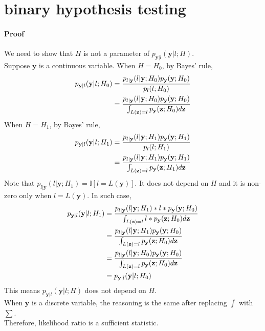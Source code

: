 \documentclass{article}
\begin{document}
\section{binary hypothesis testing}
\paragraph{Proof}
We need to show that $H$ is not a parameter of $p_{\mathbf{y}|l}(\mathbf{y}|l;H)$.\\
Suppose $\mathbf{y}$ is a continuous variable. When $H=H_0$, by Bayes' rule,
\begin{align}
	p_{\mathbf{y}|l}(\mathbf{y}|l;H_0)&=\frac{p_{l|\mathbf{y}}(l|\mathbf{y};H_0)p_{\mathbf{y}}(\mathbf{y};H_0)}{p_{l}(l;H_0)}\notag\\
	&=\frac{p_{l|\mathbf{y}}(l|\mathbf{y};H_0)p_{\mathbf{y}}(\mathbf{y};H_0)}{\int_{L(\mathbf{z})=l}p_{\mathbf{y}}(\mathbf{z};H_0)d\mathbf{z}}\notag
\end{align}
When $H=H_1$, by Bayes' rule,
\begin{align}
	p_{\mathbf{y}|l}(\mathbf{y}|l;H_1)&=\frac{p_{l|\mathbf{y}}(l|\mathbf{y};H_1)p_{\mathbf{y}}(\mathbf{y};H_1)}{p_{l}(l;H_1)}\notag\\
	&=\frac{p_{l|\mathbf{y}}(l|\mathbf{y};H_1)p_{\mathbf{y}}(\mathbf{y};H_1)}{\int_{L(\mathbf{z})=l}p_{\mathbf{y}}(\mathbf{z};H_1)d\mathbf{z}}\notag
\end{align}
Note that $p_{l|\mathbf{y}}(l|\mathbf{y};H_1)=\mathbb{I}[l=L(\mathbf{y})]$. It does not depend on $H$ and it is non-zero only when $l=L(\mathbf{y})$. In such case,
\begin{align}
	p_{\mathbf{y}|l}(\mathbf{y}|l;H_1)&=\frac{p_{l|\mathbf{y}}(l|\mathbf{y};H_1)*l*p_{\mathbf{y}}(\mathbf{y};H_0)}{\int_{L(\mathbf{z})=l}l*p_{\mathbf{y}}(\mathbf{z};H_0)d\mathbf{z}}\notag\\
	&=\frac{p_{l|\mathbf{y}}(l|\mathbf{y};H_1)p_{\mathbf{y}}(\mathbf{y};H_0)}{\int_{L(\mathbf{z})=l}p_{\mathbf{y}}(\mathbf{z};H_0)d\mathbf{z}}\notag\\
	&=\frac{p_{l|\mathbf{y}}(l|\mathbf{y};H_0)p_{\mathbf{y}}(\mathbf{y};H_0)}{\int_{L(\mathbf{z})=l}p_{\mathbf{y}}(\mathbf{z};H_0)d\mathbf{z}}\notag\\
	&=p_{\mathbf{y}|l}(\mathbf{y}|l;H_0)\notag
\end{align}
This means $p_{\mathbf{y}|l}(\mathbf{y}|l;H)$ does not depend on $H$.\\
When $\mathbf{y}$ is a discrete variable, the reasoning is the same after replacing $\int$ with $\sum$.\\
Therefore, likelihood ratio is a sufficient statistic.
\end{document}
